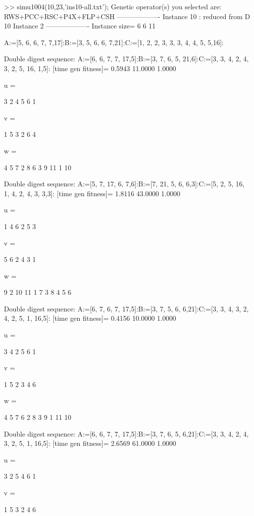 >> simu1004(10,23,'ins10-all.txt');
Genetic operator(s) you selected are:
RWS+PCC+RSC+P4X+FLP+CSH
------------------- Instance 10 : reduced from D 10 Instance 2 -------------------
Instance size=
     6     6    11

A:=[5, 6, 6, 7, 7,17]:B:=[3, 5, 6, 6, 7,21]:C:=[1, 2, 2, 3, 3, 3, 4, 4, 5, 5,16]:

Double digest sequence:
A:=[6, 6, 7, 7, 17,5]:B:=[3, 7, 6, 5, 21,6]:C:=[3, 3, 4, 2, 4, 3, 2, 5, 16, 1,5]:
[time gen fitness]=
    0.5943   11.0000    1.0000


u =

     3     2     4     5     6     1


v =

     1     5     3     2     6     4


w =

     4     5     7     2     8     6     3     9    11     1    10

Double digest sequence:
A:=[5, 7, 17, 6, 7,6]:B:=[7, 21, 5, 6, 6,3]:C:=[5, 2, 5, 16, 1, 4, 2, 4, 3, 3,3]:
[time gen fitness]=
    1.8116   43.0000    1.0000


u =

     1     4     6     2     5     3


v =

     5     6     2     4     3     1


w =

     9     2    10    11     1     7     3     8     4     5     6

Double digest sequence:
A:=[6, 7, 6, 7, 17,5]:B:=[3, 7, 5, 6, 6,21]:C:=[3, 3, 4, 3, 2, 4, 2, 5, 1, 16,5]:
[time gen fitness]=
    0.4156   10.0000    1.0000


u =

     3     4     2     5     6     1


v =

     1     5     2     3     4     6


w =

     4     5     7     6     2     8     3     9     1    11    10

Double digest sequence:
A:=[6, 6, 7, 7, 17,5]:B:=[3, 7, 6, 5, 6,21]:C:=[3, 3, 4, 2, 4, 3, 2, 5, 1, 16,5]:
[time gen fitness]=
    2.6569   61.0000    1.0000


u =

     3     2     5     4     6     1


v =

     1     5     3     2     4     6


